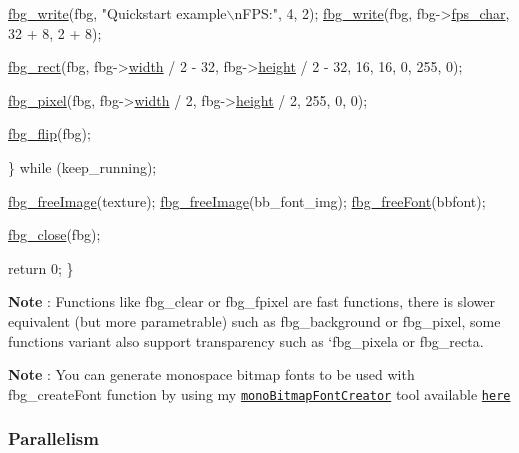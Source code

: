 \begin{DoxyCode}
        \hyperlink{fbgraphics_8h_a45d1d295d53d80013ca6d55487c02fa0}{fbg\_write}(fbg, \textcolor{stringliteral}{"Quickstart example\(\backslash\)nFPS:"}, 4, 2);
        \hyperlink{fbgraphics_8h_a45d1d295d53d80013ca6d55487c02fa0}{fbg\_write}(fbg, fbg->\hyperlink{struct__fbg_af447e6ed58d893989c8dad075807a79b}{fps\_char}, 32 + 8, 2 + 8);

        \hyperlink{fbgraphics_8h_ad208d61ec4f50a5fd13f2cc8dd2ee0e5}{fbg\_rect}(fbg, fbg->\hyperlink{struct__fbg_a1d3c76643e4ee424f4d17e27991d5e2e}{width} / 2 - 32, fbg->\hyperlink{struct__fbg_a3a3bd409e71d020fa77f69a541d832f8}{height} / 2 - 32, 16, 16, 0, 255, 0);

        \hyperlink{fbgraphics_8h_a7d81b1ddf54b0d4da0f30e36d7e2f3bb}{fbg\_pixel}(fbg, fbg->\hyperlink{struct__fbg_a1d3c76643e4ee424f4d17e27991d5e2e}{width} / 2, fbg->\hyperlink{struct__fbg_a3a3bd409e71d020fa77f69a541d832f8}{height} / 2, 255, 0, 0);

        \hyperlink{fbgraphics_8h_aedfec23bc4c51ff5ffb843bb289d448b}{fbg\_flip}(fbg);

    \} \textcolor{keywordflow}{while} (keep\_running);

    \hyperlink{fbgraphics_8h_a737482b6170ea3273d6679fdca63a27c}{fbg\_freeImage}(texture);
    \hyperlink{fbgraphics_8h_a737482b6170ea3273d6679fdca63a27c}{fbg\_freeImage}(bb\_font\_img);
    \hyperlink{fbgraphics_8h_aae823fe76a206cbc1fdd405c13d26830}{fbg\_freeFont}(bbfont);

    \hyperlink{fbgraphics_8h_a390cd3fb535cbad76856700a035ed401}{fbg\_close}(fbg);

    \textcolor{keywordflow}{return} 0;
\}
\end{DoxyCode}


{\bfseries Note} \+: Functions like {\ttfamily fbg\+\_\+clear} or {\ttfamily fbg\+\_\+fpixel} are fast functions, there is slower equivalent (but more parametrable) such as {\ttfamily fbg\+\_\+background} or {\ttfamily fbg\+\_\+pixel}, some functions variant also support transparency such as `{\ttfamily fbg\+\_\+pixela} or {\ttfamily fbg\+\_\+recta}.

{\bfseries Note} \+: You can generate monospace bitmap fonts to be used with {\ttfamily fbg\+\_\+create\+Font} function by using my \href{https://github.com/grz0zrg/monoBitmapFontCreator}{\tt mono\+Bitmap\+Font\+Creator} tool available \href{https://fbg-bitmap-font-creator.netlify.com/}{\tt here}

\subsubsection*{Parallelism}

